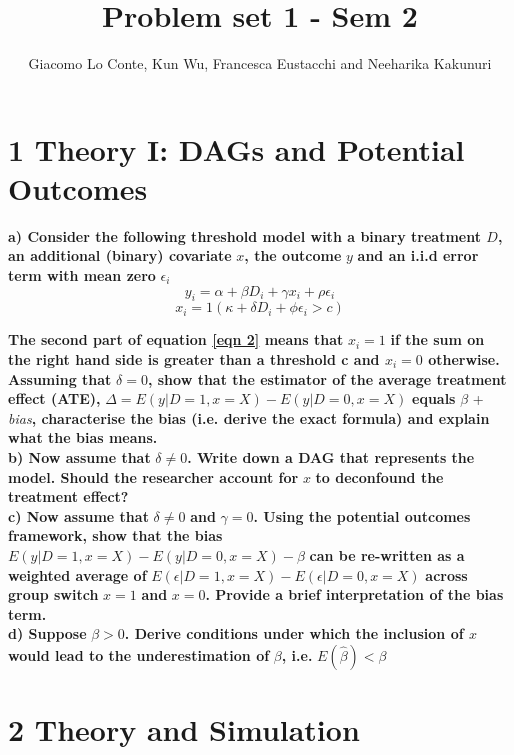 \documentclass[a4paper,12pt,oneside,English]{article}
\title{Problem set 1 - Sem 2}
\author{ Giacomo Lo Conte, Kun Wu, Francesca Eustacchi and Neeharika Kakunuri }
\begin{document}
\maketitle
\section{ 1 Theory I: DAGs and Potential Outcomes}
\textbf{a) Consider the following threshold model with a binary treatment $D$, an additional (binary) covariate} $x$\textbf{, the outcome} $y$ \textbf{and an i.i.d error term with mean zero} $\epsilon_i$
\begin{equation}
    y_i = \alpha + \beta D_i + \gamma x_i + \rho \epsilon_i
\end{equation}
\begin{equation}
     x_i = 1(\kappa + \delta D_i + \phi \epsilon_i > c) 
\end{equation}\label{eqn 2}
  
\textbf{The second part of equation \ref{eqn 2} means that} $x_i = 1$ \textbf{if the sum on the right hand side is greater than a threshold c and $x_i = 0$ otherwise. Assuming that} $\delta = 0$\textbf{, show that the estimator of the average treatment effect (ATE), }$\Delta=E(y|D = 1 ,x = X) - E(y|D = 0 ,x = X)$ \textbf{equals}  $\beta$ + \textit{bias}\textbf{, characterise the bias (i.e. derive the exact formula)  and explain what the bias means.}\\

\textbf{b) Now assume that }$\delta \neq 0$\textbf{. Write down a DAG that represents the model. Should the researcher account for }$x$ \textbf{to deconfound the treatment effect?}\\

\textbf{c) Now assume that }$\delta \not= 0$ \textbf{and} $\gamma = 0$\textbf{. Using the potential outcomes framework, show that the bias} $E(y|D = 1,x = X) − E(y|D = 0,x = X) - \beta$ \textbf{can be re-written as a weighted average of} $E(\epsilon|D=1,x=X)-E(\epsilon|D=0,x=X)$ \textbf{across group switch }$x=1$ \textbf{and} $x=0$\textbf{. Provide a brief interpretation of the bias term.}\\

\textbf{d) Suppose }$\beta > 0$\textbf{. Derive conditions under which the inclusion of $x$ would lead to the underestimation of} $\beta$\textbf{, i.e.} $E(\hat\beta) < \beta$

\newpage
\section{2 Theory and Simulation}
\end{document}
